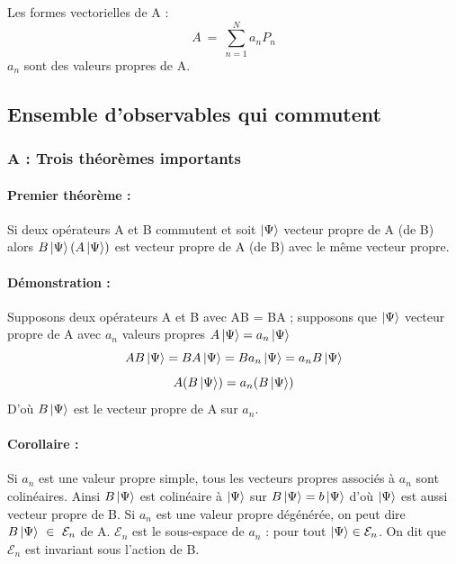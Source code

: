 \documentclass[12pt,a4paper,titlepage]{book}
\begin{document}
Les formes vectorielles de A :
\begin{equation*}
A ~=~ \sum\limits_{n=1}^{N} a_n P_n
\end{equation*}
$a_n$ sont des valeurs propres de A.\\

\subsection{Ensemble d'observables qui commutent}
\subsubsection{A : Trois théorèmes importants}

\paragraph*{Premier théorème :}

Si deux opérateurs A et B commutent et soit $\ket{\Psi}$ vecteur propre de A (de B) alors $B \ket \Psi (A \ket \Psi)$ est vecteur propre de A (de B) avec le même vecteur propre.

\paragraph*{Démonstration :}

Supposons deux opérateurs A et B avec AB = BA ; supposons que $\ket \Psi$ vecteur propre de A avec $a_n$ valeurs propres $A \ket \Psi = a_n \ket \Psi$
\begin{equation*}
AB \ket \Psi = BA \ket \Psi = B a_n \ket \Psi = a_n B \ket \Psi
\end{equation*}
\begin{equation*}
A(B \ket \Psi) = a_n (B \ket \Psi )
\end{equation*}
D'où $B \ket \Psi$ est le vecteur propre de A sur $a_n$.

\paragraph*{Corollaire :}

Si $a_n$ est une valeur propre simple, tous les vecteurs propres associés à $a_n$ sont colinéaires. Ainsi $B \ket \Psi$ est colinéaire à $\ket \Psi$ sur $B \ket \Psi = b \ket \Psi$ d'où $\ket \Psi$ est aussi vecteur propre de B. Si $a_n$ est une valeur propre dégénérée, on peut dire $B \ket \Psi ~\in~ \mathcal{E}_n$ de A. $\mathcal{E}_n$ est le sous-espace de $a_n$ : pour tout $\ket \Psi \in \mathcal{E}_n$. On dit que $\mathcal{E}_n$ est invariant sous l'action de B.
\end{document}
